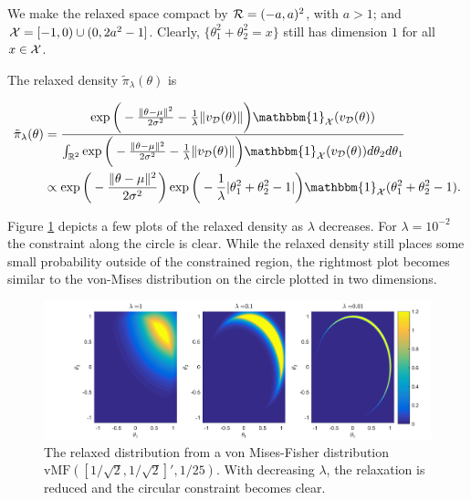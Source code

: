 \documentclass[10pt,fleqn]{article} \pdfoutput=1
\DeclareMathOperator{\1}{\mathbbm{1}} \DeclareMathOperator{\bigO}{\mc O}
\begin{document}
We make the relaxed space compact by $\mathcal{R}=(-a,a)^2$, with $a> 1$;
and $\mathcal{X}=[-1,0)\cup(0,2a^2-1]$. Clearly,
$\{\theta_1^2+\theta_2^2=x\}$ still has dimension $1$ for all $x\in \mathcal{X}$.

The relaxed density $\tilde{\pi}_\lambda(\theta)$ is

\begin{equation} \begin{split} \tilde{\pi}_\lambda(\theta)
		&=\frac{\exp\bigg(-\frac{\|\theta-\mu\|^2}{2\sigma^2} -
			\frac{1}{\lambda}\|v_{\mc D}(\theta)\| \bigg)   
			\mathbbm{1}_{\mc X}(v_{\mc D}(\theta))
			}{\int_{\mathbb{R}^2}
			\exp\bigg(-\frac{\|\theta-\mu\|^2}{2\sigma^2}-\frac{1}{\lambda}\|v_{\mc D}(\theta)\|
		\bigg)  \mathbbm{1}_{\mc X}(v_{\mc D}(\theta))    d\theta_2d\theta_1}
			\\ & \propto
		\exp\bigg(-\frac{\|\theta-\mu\|^2}{2\sigma^2}\bigg)\exp\bigg( -
		\frac{1}{\lambda}|\theta_1^2+\theta_2^2-1| \bigg)  \mathbbm{1}_{\mc X}(\theta_1^2+\theta_2^2-1).  \end{split}
	\label{EQ:Relaxed_Density_Bivariate_Unit_Circle} \end{equation}

Figure \ref{FIG:Bivariate_Normal_Unit_Circle_Constraint} depicts a few
plots of the relaxed density as $\lambda$ decreases.  For $\lambda=10^{-2}$
the constraint along the circle is clear. While the relaxed density still
places some small probability outside of the constrained region, the
rightmost plot becomes similar to the von-Mises distribution on the circle
plotted in two dimensions.




\begin{figure}[H]
	\begin{center}
		\includegraphics[width=1\textwidth]{Bivariate_Normal_Unit_Circle_Constraint}
		\caption{The relaxed distribution from a von Mises-Fisher
			distribution $\mbox{vMF}(
			[1/\sqrt{2},1/\sqrt{2}]',1/25)$. With decreasing	$\lambda$, the relaxation is reduced
			and the circular constraint becomes clear.}
		\label{FIG:Bivariate_Normal_Unit_Circle_Constraint} \end{center}
\end{figure}
\end{document}
